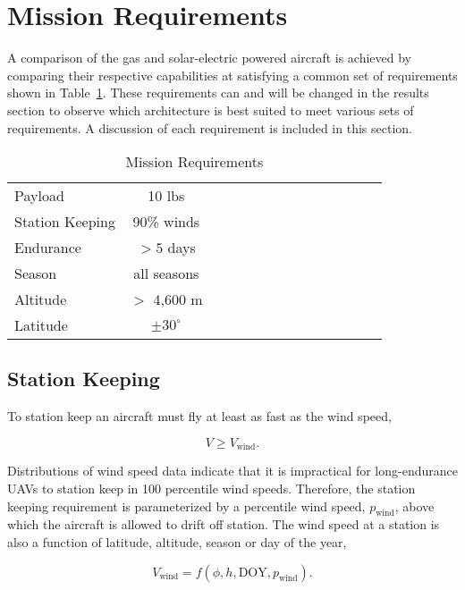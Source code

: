 \section{Mission Requirements}

A comparison of the gas and solar-electric powered aircraft is achieved by comparing their respective capabilities at satisfying a common set of requirements shown in Table~\ref{t:mreqs}.  These requirements can and will be changed in the results section to observe which architecture is best suited to meet various sets of requirements. A discussion of each requirement is included in this section.  

\begin{longtable}{lccccccccccccc}
\caption{Mission Requirements}\\
\toprule
\toprule
\label{t:mreqs}
Payload & 10 lbs\\
Station Keeping & 90\% winds \\
Endurance & $>5$ days\\
Season & all seasons\\
Altitude & $>$ 4,600 m\\
Latitude & $\pm30^{\circ}$\\
\bottomrule
\end{longtable}

\subsection{Station Keeping}

To station keep an aircraft must fly at least as fast as the wind speed,

\begin{equation}
    \label{e:availreq}
    V \geq V_{\text{wind}}.
\end{equation}

Distributions of wind speed data\cite{wind} indicate that it is impractical for long-endurance UAVs to station keep in 100 percentile wind speeds.  
Therefore, the station keeping requirement is parameterized by a percentile wind speed, $p_{\text{wind}}$, above which the aircraft is allowed to drift off station. 
The wind speed at a station is also a function of latitude, altitude, season or day of the year,

\begin{equation}
    \label{e:windspeed}
    V_{\text{wind}} = f(\phi, h, \text{DOY}, p_{\text{wind}}).
    \end{equation}

